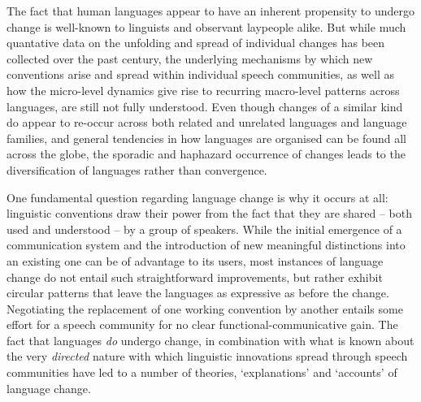 



The fact that human languages appear to have an inherent propensity to undergo change is well-known to linguists and observant laypeople alike.
But while much quantative data on the unfolding and spread of individual changes has been collected over the past century, the underlying mechanisms by which new conventions arise and spread within individual speech communities, as well as how the micro-level dynamics give rise to recurring macro-level patterns across languages, are still not fully understood.
Even though changes of a similar kind do appear to re-occur across both related and unrelated languages and language families, and general tendencies in how languages are organised can be found all across the globe, the sporadic and haphazard occurrence of changes leads to the diversification of languages rather than convergence.

One fundamental question regarding language change is why it occurs at all: linguistic conventions draw their power from the fact that they are shared -- both used and understood -- by a group of speakers. While the initial emergence of a communication system and the introduction of new meaningful distinctions into an existing one can be of advantage to its users, most instances of language change do not entail such straightforward improvements, 
but rather exhibit circular patterns that leave the languages as expressive as before the change. Negotiating the replacement of one working convention by another entails some effort for a speech community for no clear functional-communicative gain.
The fact that languages \emph{do} undergo change, in combination with what is known about the very \emph{directed} nature with which linguistic innovations spread through speech communities have led to a number of theories, `explanations' and `accounts' of language change.

